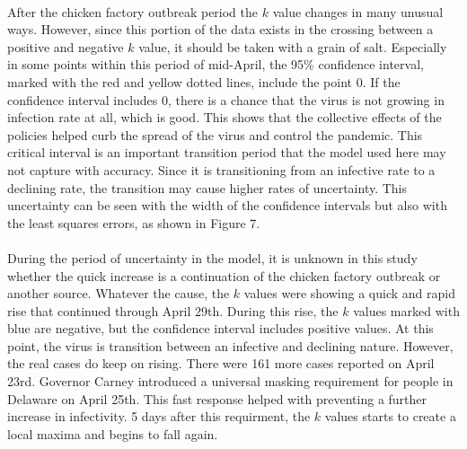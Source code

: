 \documentclass[12pt]{article}
\begin{document}
\paragraph{} After the chicken factory outbreak period the $k$ value changes in many unusual ways. However, since this portion of the data exists in the crossing between a positive and negative $k$ value, it should be taken with a grain of salt. Especially in some points within this period of mid-April, the 95\% confidence interval, marked with the red and yellow dotted lines, include the point 0. If the confidence interval includes 0, there is a chance that the virus is not growing in infection rate at all, which is good. This shows that the collective effects of the policies helped curb the spread of the virus and control the pandemic. This critical interval is an important transition period that the model used here may not capture with accuracy. Since it is transitioning from an infective rate to a declining rate, the transition may cause higher rates of uncertainty. This uncertainty can be seen with the width of the confidence intervals but also with the least squares errors, as shown in Figure 7.

\paragraph{} During the period of uncertainty in the model, it is unknown in this study whether the quick increase is a continuation of the chicken factory outbreak or another source. Whatever the cause, the $k$ values were showing a quick and rapid rise that continued through April 29th. During this rise, the $k$ values marked with blue are negative, but the confidence interval includes positive values. At this point, the virus is transition between an infective and declining nature. However, the real cases do keep on rising. There were 161 more cases reported on April 23rd. Governor Carney introduced a universal masking requirement for people in Delaware on April 25th. This fast response helped with preventing a further increase in infectivity. 5 days after this requirment, the $k$ values starts to create a local maxima and begins to fall again.
\end{document}
